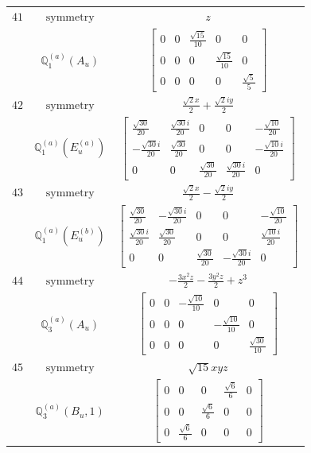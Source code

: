 \documentclass[fleqn,8pt,landscape]{jsarticle}
\begin{document}
\begin{longtable}{ccc}
$ 41 $ & $ \text{symmetry} $ & $ z $ \\
$  $ & $ \mathbb{Q}_{1}^{(a)}(A_{u}) $ & $ \begin{bmatrix} 0 & 0 & \frac{\sqrt{15}}{10} & 0 & 0 \\ 0 & 0 & 0 & \frac{\sqrt{15}}{10} & 0 \\ 0 & 0 & 0 & 0 & \frac{\sqrt{5}}{5} \end{bmatrix} $ \\ \hline
$ 42 $ & $ \text{symmetry} $ & $ \frac{\sqrt{2} x}{2} + \frac{\sqrt{2} i y}{2} $ \\
$  $ & $ \mathbb{Q}_{1}^{(a)}(E_{u}^{(a)}) $ & $ \begin{bmatrix} \frac{\sqrt{30}}{20} & \frac{\sqrt{30} i}{20} & 0 & 0 & - \frac{\sqrt{10}}{20} \\ - \frac{\sqrt{30} i}{20} & \frac{\sqrt{30}}{20} & 0 & 0 & - \frac{\sqrt{10} i}{20} \\ 0 & 0 & \frac{\sqrt{30}}{20} & \frac{\sqrt{30} i}{20} & 0 \end{bmatrix} $ \\ \hline
$ 43 $ & $ \text{symmetry} $ & $ \frac{\sqrt{2} x}{2} - \frac{\sqrt{2} i y}{2} $ \\
$  $ & $ \mathbb{Q}_{1}^{(a)}(E_{u}^{(b)}) $ & $ \begin{bmatrix} \frac{\sqrt{30}}{20} & - \frac{\sqrt{30} i}{20} & 0 & 0 & - \frac{\sqrt{10}}{20} \\ \frac{\sqrt{30} i}{20} & \frac{\sqrt{30}}{20} & 0 & 0 & \frac{\sqrt{10} i}{20} \\ 0 & 0 & \frac{\sqrt{30}}{20} & - \frac{\sqrt{30} i}{20} & 0 \end{bmatrix} $ \\ \hline
$ 44 $ & $ \text{symmetry} $ & $ - \frac{3 x^{2} z}{2} - \frac{3 y^{2} z}{2} + z^{3} $ \\
$  $ & $ \mathbb{Q}_{3}^{(a)}(A_{u}) $ & $ \begin{bmatrix} 0 & 0 & - \frac{\sqrt{10}}{10} & 0 & 0 \\ 0 & 0 & 0 & - \frac{\sqrt{10}}{10} & 0 \\ 0 & 0 & 0 & 0 & \frac{\sqrt{30}}{10} \end{bmatrix} $ \\ \hline
$ 45 $ & $ \text{symmetry} $ & $ \sqrt{15} x y z $ \\
$  $ & $ \mathbb{Q}_{3}^{(a)}(B_{u},1) $ & $ \begin{bmatrix} 0 & 0 & 0 & \frac{\sqrt{6}}{6} & 0 \\ 0 & 0 & \frac{\sqrt{6}}{6} & 0 & 0 \\ 0 & \frac{\sqrt{6}}{6} & 0 & 0 & 0 \end{bmatrix} $ \\ \hline

\end{longtable}
\end{document}
